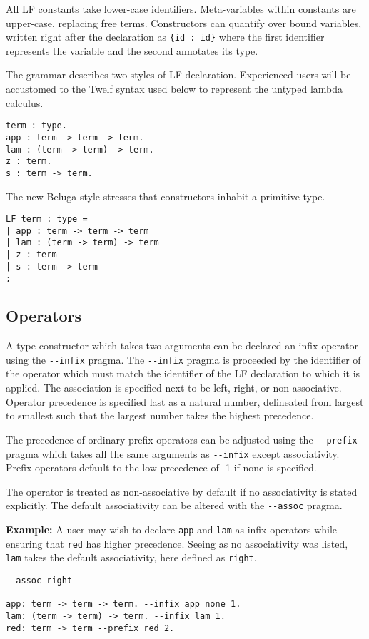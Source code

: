 \documentclass[11pt]{article}
\begin{document}
All LF constants take lower-case identifiers.
Meta-variables within constants are upper-case, replacing free terms.
Constructors can quantify over bound variables, written right after the declaration as \verb+{id : id}+ where the first identifier represents the variable and the second annotates its type.

The grammar describes two styles of LF declaration.
Experienced users will be accustomed to the Twelf syntax used below to represent the untyped lambda calculus.
\begin{verbatim}
term : type.
app : term -> term -> term.
lam : (term -> term) -> term.
z : term.
s : term -> term.
\end{verbatim}

The new Beluga style stresses that constructors inhabit a primitive type.
\begin{verbatim}
LF term : type =
| app : term -> term -> term
| lam : (term -> term) -> term
| z : term
| s : term -> term
;
\end{verbatim}

\subsection{Operators}
A type constructor which takes two arguments can be declared an infix operator using the \verb+--infix+ pragma.
The \verb+--infix+ pragma is proceeded by the identifier of the operator which must match the identifier of the LF declaration to which it is applied.
The association is specified next to be left, right, or non-associative.
Operator precedence is specified last as a natural number, delineated from largest to smallest such that the largest number takes the highest precedence.

The precedence of ordinary prefix operators can be adjusted using the \verb+--prefix+ pragma which takes all the same arguments as \verb+--infix+ except associativity.
Prefix operators default to the low precedence of -1 if none is specified.

The operator is treated as non-associative by default if no associativity is stated explicitly.
The default associativity can be altered with the \verb+--assoc+ pragma.

\textbf{Example:} A user may wish to declare \verb+app+ and \verb+lam+ as infix operators while ensuring that \verb+red+ has higher precedence.
Seeing as no associativity was listed, \verb+lam+ takes the default associativity, here defined as \verb+right+.
\begin{verbatim}
--assoc right

app: term -> term -> term. --infix app none 1.
lam: (term -> term) -> term. --infix lam 1.
red: term -> term --prefix red 2.
\end{verbatim}
\end{document}
